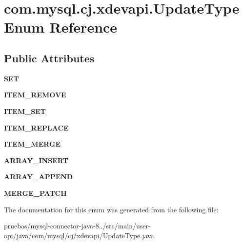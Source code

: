 \hypertarget{enumcom_1_1mysql_1_1cj_1_1xdevapi_1_1_update_type}{}\section{com.\+mysql.\+cj.\+xdevapi.\+Update\+Type Enum Reference}
\label{enumcom_1_1mysql_1_1cj_1_1xdevapi_1_1_update_type}
\subsection*{Public Attributes}
\begin{DoxyCompactItemize}
\item 
\mbox{\label{enumcom_1_1mysql_1_1cj_1_1xdevapi_1_1_update_type_a5b66ffe275997597cef8611505174045}} 
{\bfseries S\+ET}
\item 
\mbox{\label{enumcom_1_1mysql_1_1cj_1_1xdevapi_1_1_update_type_a92ffa005c85171613bd269273c59fd83}} 
{\bfseries I\+T\+E\+M\+\_\+\+R\+E\+M\+O\+VE}
\item 
\mbox{\label{enumcom_1_1mysql_1_1cj_1_1xdevapi_1_1_update_type_a9f4eaaf18702cab9db7f6200324a638d}} 
{\bfseries I\+T\+E\+M\+\_\+\+S\+ET}
\item 
\mbox{\label{enumcom_1_1mysql_1_1cj_1_1xdevapi_1_1_update_type_a86b9729e2e664a76b71ceb75e0bf042c}} 
{\bfseries I\+T\+E\+M\+\_\+\+R\+E\+P\+L\+A\+CE}
\item 
\mbox{\label{enumcom_1_1mysql_1_1cj_1_1xdevapi_1_1_update_type_ab1ba8af34e767d5a9fd837dea8e028f2}} 
{\bfseries I\+T\+E\+M\+\_\+\+M\+E\+R\+GE}
\item 
\mbox{\label{enumcom_1_1mysql_1_1cj_1_1xdevapi_1_1_update_type_a1dd689d9bbaf2c59c90350397c70020b}} 
{\bfseries A\+R\+R\+A\+Y\+\_\+\+I\+N\+S\+E\+RT}
\item 
\mbox{\label{enumcom_1_1mysql_1_1cj_1_1xdevapi_1_1_update_type_acf977f34fa31536646290aec771d1ec7}} 
{\bfseries A\+R\+R\+A\+Y\+\_\+\+A\+P\+P\+E\+ND}
\item 
\mbox{\label{enumcom_1_1mysql_1_1cj_1_1xdevapi_1_1_update_type_ad254a3ff874e2ba2541c17d96823ba7a}} 
{\bfseries M\+E\+R\+G\+E\+\_\+\+P\+A\+T\+CH}
\end{DoxyCompactItemize}


The documentation for this enum was generated from the following file\+:\begin{DoxyCompactItemize}
\item 
pruebas/mysql-\/connector-\/java-\/8../src/main/user-\/api/java/com/mysql/cj/xdevapi/Update\+Type.\+java\end{DoxyCompactItemize}
